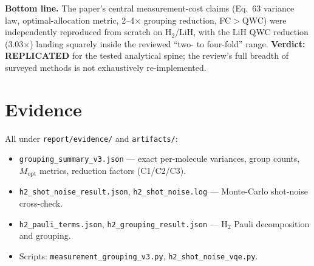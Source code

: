 \documentclass[11pt]{article}
\begin{document}
\textbf{Bottom line.} The paper's central measurement-cost claims (Eq.~63
variance law, optimal-allocation metric, 2--4$\times$ grouping reduction,
FC$>$QWC) were independently reproduced from scratch on H$_2$/LiH, with the
LiH QWC reduction (3.03$\times$) landing squarely inside the reviewed
``two- to four-fold'' range. \textbf{Verdict: REPLICATED} for the tested
analytical spine; the review's full breadth of surveyed methods is not
exhaustively re-implemented.

\section{Evidence}

All under \texttt{report/evidence/} and \texttt{artifacts/}:
\begin{itemize}
\item \texttt{grouping\_summary\_v3.json} --- exact per-molecule variances,
  group counts, $M_{\mathrm{opt}}$ metrics, reduction factors (C1/C2/C3).
\item \texttt{h2\_shot\_noise\_result.json}, \texttt{h2\_shot\_noise.log}
  --- Monte-Carlo shot-noise cross-check.
\item \texttt{h2\_pauli\_terms.json}, \texttt{h2\_grouping\_result.json}
  --- H$_2$ Pauli decomposition and grouping.
\item Scripts: \texttt{measurement\_grouping\_v3.py},
  \texttt{h2\_shot\_noise\_vqe.py}.
\end{itemize}


\end{document}
